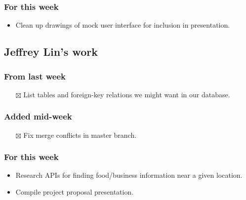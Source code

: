 \documentclass[12pt,letterpaper]{article}
\newcommand{\done}{$\boxtimes$}
\begin{document}

\subsubsection*{For this week}
\begin{itemize}
  \item Clean up drawings of mock user interface for inclusion in presentation.
\end{itemize}


\vfill
\subsection*{Jeffrey Lin's work}
\subsubsection*{From last week}
\begin{itemize}
  \item[\done] List tables and foreign-key relations we might want in our database.
\end{itemize}

\subsubsection*{Added mid-week}
\begin{itemize}
  \item[\done] Fix merge conflicts in master branch.
\end{itemize}

\subsubsection*{For this week}
\begin{itemize}
  \item Research APIs for finding food/business information near a given location.
  \item Compile project proposal presentation.
\end{itemize}
\end{document}
